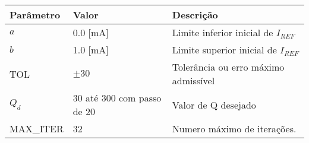 \begin{tabular}{@{}lll@{}}
\toprule
\textbf{Parâmetro} & \textbf{Valor} & \textbf{Descrição}                   \\ \midrule
$a$                & 0.0 [mA]            & Limite inferior inicial de $I_{REF}$ \\
$b$                & 1.0 [mA]            & Limite superior inicial de $I_{REF}$ \\
TOL                & $\pm 30$       & Tolerância ou erro máximo admissível \\
$Q_d$              & 30 até 300 com passo de 20           & Valor de Q desejado                  \\
MAX\_ITER           & 32             & Numero máximo de iterações.          \\ \bottomrule
\end{tabular}
